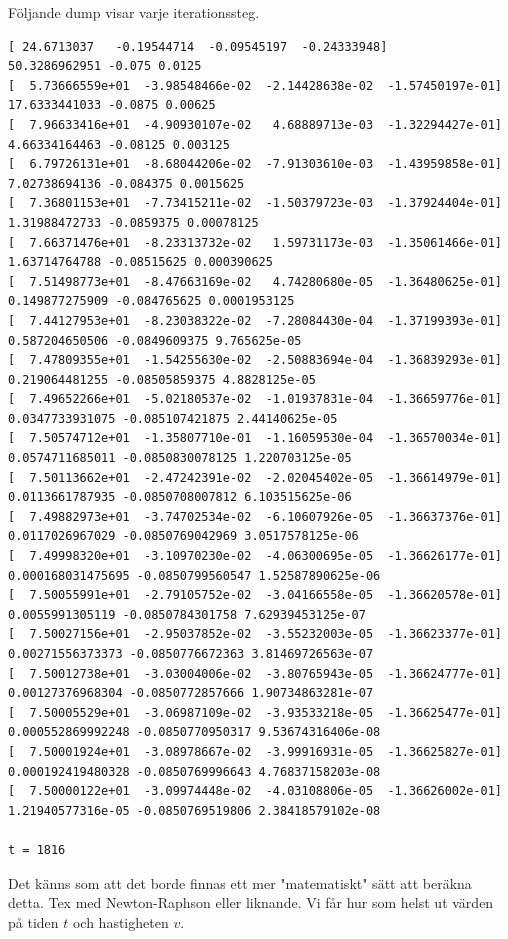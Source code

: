 \documentclass[11pt,twoside]{article}
\begin{document}
Följande dump visar varje iterationssteg. 
\begin{lstlisting}
[ 24.6713037   -0.19544714  -0.09545197  -0.24333948]
50.3286962951 -0.075 0.0125
[  5.73666559e+01  -3.98548466e-02  -2.14428638e-02  -1.57450197e-01]
17.6333441033 -0.0875 0.00625
[  7.96633416e+01  -4.90930107e-02   4.68889713e-03  -1.32294427e-01]
4.66334164463 -0.08125 0.003125
[  6.79726131e+01  -8.68044206e-02  -7.91303610e-03  -1.43959858e-01]
7.02738694136 -0.084375 0.0015625
[  7.36801153e+01  -7.73415211e-02  -1.50379723e-03  -1.37924404e-01]
1.31988472733 -0.0859375 0.00078125
[  7.66371476e+01  -8.23313732e-02   1.59731173e-03  -1.35061466e-01]
1.63714764788 -0.08515625 0.000390625
[  7.51498773e+01  -8.47663169e-02   4.74280680e-05  -1.36480625e-01]
0.149877275909 -0.084765625 0.0001953125
[  7.44127953e+01  -8.23038322e-02  -7.28084430e-04  -1.37199393e-01]
0.587204650506 -0.0849609375 9.765625e-05
[  7.47809355e+01  -1.54255630e-02  -2.50883694e-04  -1.36839293e-01]
0.219064481255 -0.08505859375 4.8828125e-05
[  7.49652266e+01  -5.02180537e-02  -1.01937831e-04  -1.36659776e-01]
0.0347733931075 -0.085107421875 2.44140625e-05
[  7.50574712e+01  -1.35807710e-01  -1.16059530e-04  -1.36570034e-01]
0.0574711685011 -0.0850830078125 1.220703125e-05
[  7.50113662e+01  -2.47242391e-02  -2.02045402e-05  -1.36614979e-01]
0.0113661787935 -0.0850708007812 6.103515625e-06
[  7.49882973e+01  -3.74702534e-02  -6.10607926e-05  -1.36637376e-01]
0.0117026967029 -0.0850769042969 3.0517578125e-06
[  7.49998320e+01  -3.10970230e-02  -4.06300695e-05  -1.36626177e-01]
0.000168031475695 -0.0850799560547 1.52587890625e-06
[  7.50055991e+01  -2.79105752e-02  -3.04166558e-05  -1.36620578e-01]
0.0055991305119 -0.0850784301758 7.62939453125e-07
[  7.50027156e+01  -2.95037852e-02  -3.55232003e-05  -1.36623377e-01]
0.00271556373373 -0.0850776672363 3.81469726563e-07
[  7.50012738e+01  -3.03004006e-02  -3.80765943e-05  -1.36624777e-01]
0.00127376968304 -0.0850772857666 1.90734863281e-07
[  7.50005529e+01  -3.06987109e-02  -3.93533218e-05  -1.36625477e-01]
0.000552869992248 -0.0850770950317 9.53674316406e-08
[  7.50001924e+01  -3.08978667e-02  -3.99916931e-05  -1.36625827e-01]
0.000192419480328 -0.0850769996643 4.76837158203e-08
[  7.50000122e+01  -3.09974448e-02  -4.03108806e-05  -1.36626002e-01]
1.21940577316e-05 -0.0850769519806 2.38418579102e-08

t = 1816
\end{lstlisting}

Det känns som att det borde finnas ett mer "matematiskt" sätt att beräkna detta. Tex med Newton-Raphson eller liknande. Vi får hur som helst ut värden på tiden $t$ och hastigheten $v$.
\end{document}
